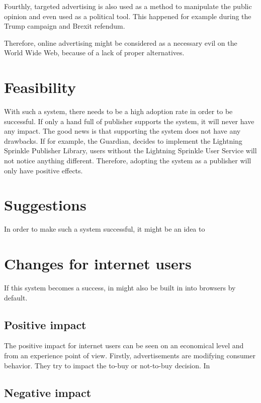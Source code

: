 Fourthly, targeted advertising is also used as a method to manipulate the public opinion and even used as a political tool. This happened for example during the Trump campaign and Brexit refendum\cite{cadwalladr2018cambridge}.

Therefore, online advertising might be considered as a necessary evil on the World Wide Web, because of a lack of proper alternatives.

\section{Feasibility}
With such a system, there needs to be a high adoption rate in order to be successful. If only a hand full of publisher supports the system, it will never have any impact. The good news is that supporting the system does not have any drawbacks. If for example, the Guardian, decides to implement the Lightning Sprinkle Publisher Library, users without the Lightning Sprinkle User Service will not notice anything different. Therefore, adopting the system as a publisher will only have positive effects.

\section{Suggestions}
In order to make such a system successful, it might be an idea to 


\section{Changes for internet users}
If this system becomes a success, in might also be built in into browsers by default. 

\subsection{Positive impact}
The positive impact for internet users can be seen on an economical level and from an experience point of view. Firstly, advertisements are modifying consumer behavior. They try to impact the to-buy or not-to-buy decision\cite{johnson2007consumer}. In 

\subsection{Negative impact}
